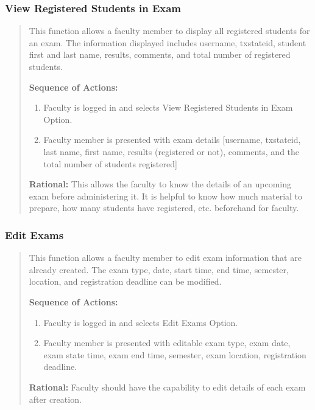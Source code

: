    \subsubsection{View Registered Students in Exam} 
   \begin{quote} %
         This function allows a faculty member to display all registered
         students for an exam. The information displayed includes username,
         txstateid, student first and last name, results, comments, and total
         number of registered students.
         
         \textbf{Sequence of Actions:}
         \begin{enumerate}
            \item Faculty is logged in and selects View Registered Students in Exam
               Option.
            \item Faculty member is presented with exam details [username,
               txstateid, last name, first name, results (registered or not),
               comments, and the total number of students registered]
         \end{enumerate}

         \textbf{Rational:}
         This allows the faculty to know the details of an upcoming exam before
         administering it. It is helpful to know how much material to prepare,
         how many students have registered, etc. beforehand for faculty.
   \end{quote} %

   \subsubsection{Edit Exams} 
   \begin{quote} %
         This function allows a faculty member to edit exam information that are already
         created. The exam type, date, start time, end time, semester,
         location, and registration deadline can be modified. 
         
         \textbf{Sequence of Actions:}
         \begin{enumerate}
            \item Faculty is logged in and selects Edit Exams Option.
            \item Faculty member is presented with editable exam type, exam
               date, exam state time, exam end time, semester, exam location,
               registration deadline. 
         \end{enumerate}

         \textbf{Rational:}
         Faculty should have the capability to edit details of each exam after
         creation.
   \end{quote} %

